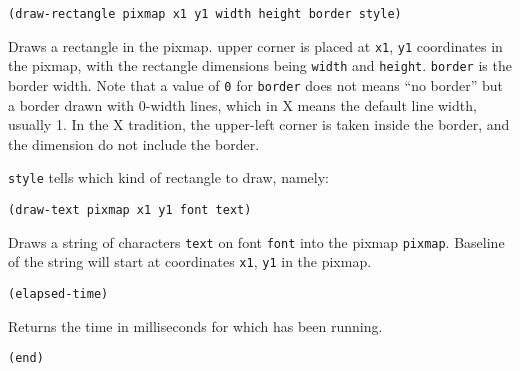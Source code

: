 {\usagefont\begin{verbatim}
(draw-rectangle pixmap x1 y1 width height border style)
\end{verbatim}}\usageupspace

Draws a rectangle in the pixmap. upper corner is placed at \verb|x1|,
\verb|y1| coordinates in the pixmap, with the rectangle dimensions being
\verb|width| and \verb|height|. \verb|border| is the border width. Note that a
value of \verb|0| for \verb|border| does not means ``no border'' but a border
drawn with 0-width lines, which in X means the default line width, usually 1.
In the X tradition, the upper-left corner is taken inside the border, and the
dimension do not include the border.

\verb|style| tells which kind of rectangle to draw, namely:


        
{\usagefont\begin{verbatim}
(draw-text pixmap x1 y1 font text)
\end{verbatim}}\usageupspace

Draws a string of characters \verb|text| on font \verb|font| into the pixmap
\verb|pixmap|. Baseline of the string will start at coordinates \verb|x1|,
\verb|y1| in the pixmap.



{\usagefont\begin{verbatim}
(elapsed-time)
\end{verbatim}}\usageupspace

Returns the time in milliseconds for which {\GWM} has been running.

        
{\usagefont\begin{verbatim}
(end)
\end{verbatim}}\usageupspace

